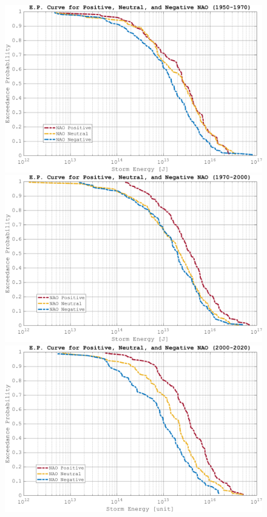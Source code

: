         \begin{figure}[ht]
            \begin{minipage}[t]{0.7\textwidth}
                \includegraphics[width=\textwidth]{figures/EP_curve_1950_1970.png}
                \includegraphics[width=\textwidth]{figures/EP_curve_1970_2000.png}
                \includegraphics[width=\textwidth]{figures/EP_curve_2000_2020.png}

\end{minipage}
\end{figure}
